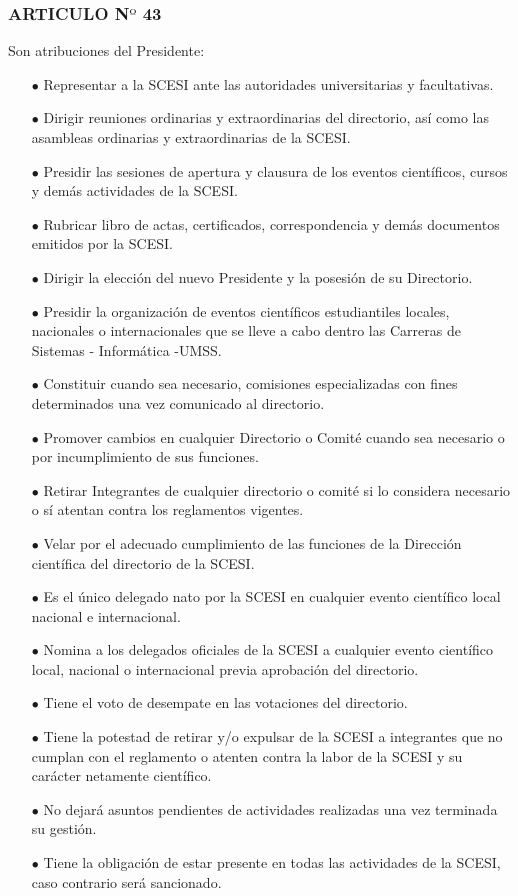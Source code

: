 \documentclass[letterpaper,11pt]{book}
\begin{document}
\begin{itemize}
\subsubsection*{ARTICULO N$º$ 43}
Son atribuciones del Presidente:
\begin{itemize}
\item[$\bullet$] Representar a la SCESI ante las autoridades universitarias y facultativas. 
\item[$\bullet$] Dirigir reuniones ordinarias y extraordinarias del directorio, así como las asambleas ordinarias y extraordinarias de la SCESI. 
\item[$\bullet$] Presidir las sesiones de apertura y clausura de los eventos científicos, cursos y demás actividades de la SCESI.
\item[$\bullet$] Rubricar libro de actas, certificados, correspondencia y demás documentos emitidos por la SCESI.
\item[$\bullet$] Dirigir la elección del nuevo Presidente y la posesión de su Directorio.
\item[$\bullet$] Presidir la organización de eventos científicos estudiantiles locales, nacionales o internacionales que se lleve a cabo dentro las Carreras de Sistemas - Informática -UMSS.
\item[$\bullet$] Constituir cuando sea necesario, comisiones especializadas con fines determinados una vez comunicado al directorio. 
\item[$\bullet$] Promover cambios en cualquier Directorio o Comité cuando sea necesario o por incumplimiento de sus funciones.
\item[$\bullet$] Retirar Integrantes de cualquier directorio o comité si lo considera necesario o sí atentan contra los reglamentos vigentes.
\item[$\bullet$] Velar por el adecuado cumplimiento de las funciones de la Dirección científica del directorio de la SCESI.
\item[$\bullet$] Es el único delegado nato por la SCESI en cualquier evento científico local nacional e internacional.
\item[$\bullet$] Nomina a los delegados oficiales de la SCESI a cualquier evento científico local, nacional o internacional previa aprobación del directorio. 
\item[$\bullet$] Tiene el voto de desempate en las votaciones del directorio.
\item[$\bullet$] Tiene la potestad de retirar y/o expulsar de la SCESI a integrantes que no cumplan con el reglamento o atenten contra la labor de la SCESI y su carácter netamente científico.
\item[$\bullet$] No dejará asuntos pendientes de actividades realizadas una vez terminada su gestión.
\item[$\bullet$] Tiene la obligación de estar presente en todas las actividades de la SCESI, caso contrario será sancionado.
\end{itemize}


\end{itemize}
\end{document}
